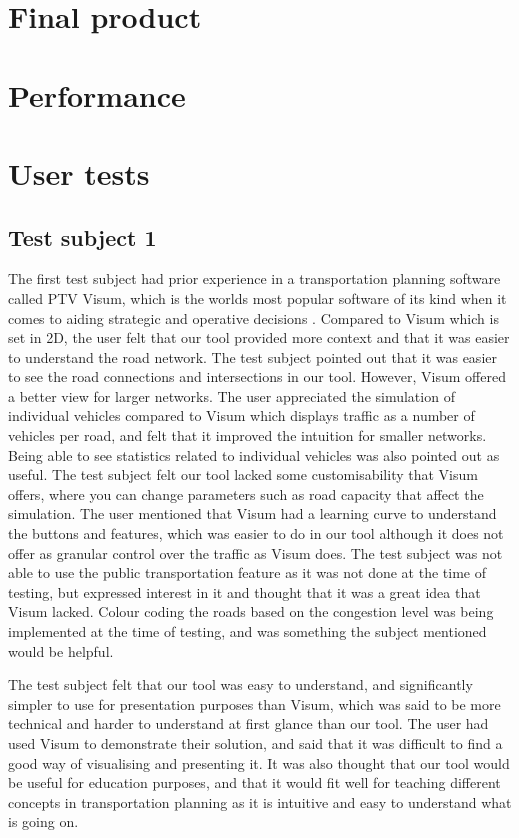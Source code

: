 
\section{Final product}

\section{Performance}


\section{User tests}
    \subsection{Test subject 1}
        The first test subject had prior experience in a transportation planning software called PTV Visum, which is the worlds most popular software of its kind when it comes to aiding strategic and operative decisions \cite{visum}. Compared to Visum which is set in 2D, the user felt that our tool provided more context and that it was easier to understand the road network. The test subject pointed out that it was easier to see the road connections and intersections in our tool. However, Visum offered a better view for larger networks. The user appreciated the simulation of individual vehicles compared to Visum which displays traffic as a number of vehicles per road, and felt that it improved the intuition for smaller networks. Being able to see statistics related to individual vehicles was also pointed out as useful. The test subject felt our tool lacked some customisability that Visum offers, where you can change parameters such as road capacity that affect the simulation. The user mentioned that Visum had a learning curve to understand the buttons and features, which was easier to do in our tool although it does not offer as granular control over the traffic as Visum does. The test subject was not able to use the public transportation feature as it was not done at the time of testing, but expressed interest in it and thought that it was a great idea that Visum lacked. Colour coding the roads based on the congestion level was being implemented at the time of testing, and was something the subject mentioned would be helpful.

        The test subject felt that our tool was easy to understand, and significantly simpler to use for presentation purposes than Visum, which was said to be more technical and harder to understand at first glance than our tool. The user had used Visum to demonstrate their solution, and said that it was difficult to find a good way of visualising and presenting it. It was also thought that our tool would be useful for education purposes, and that it would fit well for teaching different concepts in transportation planning as it is intuitive and easy to understand what is going on.

